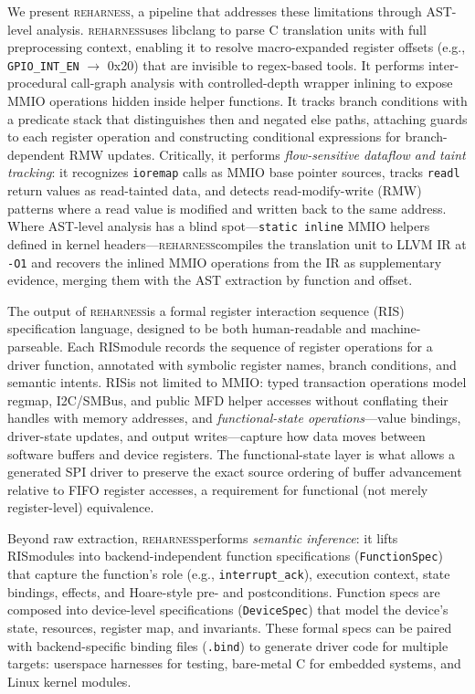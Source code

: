 \documentclass[sigplan, screen, review, anonymous]{acmart}
\newcommand{\reharness}{\textsc{reharness}}
\newcommand{\rislang}{RIS}
\begin{document}
We present \reharness, a pipeline that addresses these limitations through AST-level analysis. \reharness uses libclang to parse C translation units with full preprocessing context, enabling it to resolve macro-expanded register offsets (e.g., \texttt{GPIO\_INT\_EN} $\rightarrow$ 0x20) that are invisible to regex-based tools. It performs inter-procedural call-graph analysis with controlled-depth wrapper inlining to expose MMIO operations hidden inside helper functions. It tracks branch conditions with a predicate stack that distinguishes then and negated else paths, attaching guards to each register operation and constructing conditional expressions for branch-dependent RMW updates. Critically, it performs \emph{flow-sensitive dataflow and taint tracking}: it recognizes \texttt{ioremap} calls as MMIO base pointer sources, tracks \texttt{readl} return values as read-tainted data, and detects read-modify-write (RMW) patterns where a read value is modified and written back to the same address. Where AST-level analysis has a blind spot---\texttt{static inline} MMIO helpers defined in kernel headers---\reharness compiles the translation unit to LLVM IR at \texttt{-O1} and recovers the inlined MMIO operations from the IR as supplementary evidence, merging them with the AST extraction by function and offset.

The output of \reharness is a formal register interaction sequence (\rislang) specification language, designed to be both human-readable and machine-parseable. Each \rislang module records the sequence of register operations for a driver function, annotated with symbolic register names, branch conditions, and semantic intents. \rislang is not limited to MMIO: typed transaction operations model regmap, I2C/SMBus, and public MFD helper accesses without conflating their handles with memory addresses, and \emph{functional-state operations}---value bindings, driver-state updates, and output writes---capture how data moves between software buffers and device registers. The functional-state layer is what allows a generated SPI driver to preserve the exact source ordering of buffer advancement relative to FIFO register accesses, a requirement for functional (not merely register-level) equivalence.

Beyond raw extraction, \reharness performs \emph{semantic inference}: it lifts \rislang modules into backend-independent function specifications (\texttt{FunctionSpec}) that capture the function's role (e.g., \texttt{interrupt\_ack}), execution context, state bindings, effects, and Hoare-style pre- and postconditions. Function specs are composed into device-level specifications (\texttt{DeviceSpec}) that model the device's state, resources, register map, and invariants. These formal specs can be paired with backend-specific binding files (\texttt{.bind}) to generate driver code for multiple targets: userspace harnesses for testing, bare-metal C for embedded systems, and Linux kernel modules.
\end{document}
